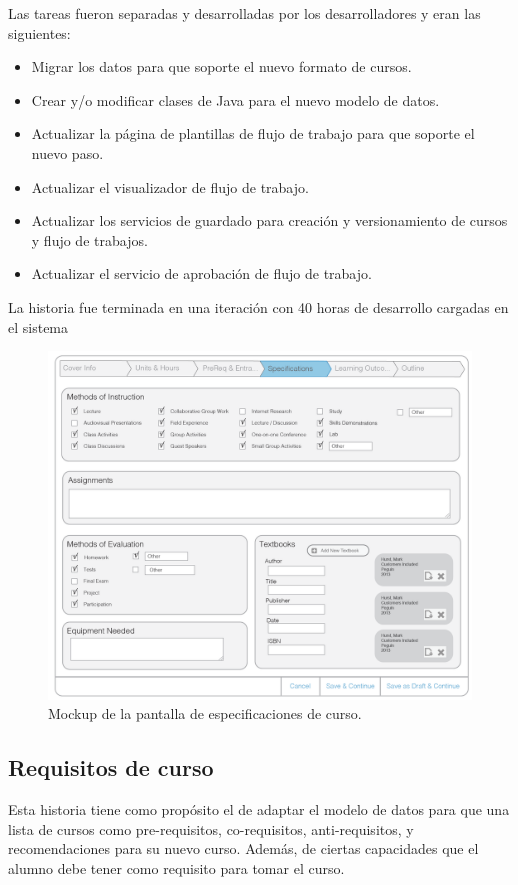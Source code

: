 Las tareas fueron separadas y desarrolladas por los desarrolladores y eran las siguientes:
\begin{itemize}
	\item Migrar los datos para que soporte el nuevo formato de cursos.
	\item Crear y/o modificar clases de Java para el nuevo modelo de datos.
	\item Actualizar la página de plantillas de flujo de trabajo para que soporte el nuevo paso.
	\item Actualizar el visualizador de flujo de trabajo.
	\item Actualizar los servicios de guardado para creación y versionamiento de cursos y flujo de trabajos.
	\item Actualizar el servicio de aprobación de flujo de trabajo.
\end{itemize}

La historia fue terminada en una iteración con 40 horas de desarrollo cargadas en el sistema

\begin{figure}[H]
\centering
\includegraphics[scale=0.3]{Capitulos/DesarrollodelaAplicacion/Imagenes/course_specs}
\caption{Mockup de la pantalla de especificaciones de curso.}
  \label{course_specs}
\end{figure}

\subsection{Requisitos de curso}
Esta historia tiene como propósito el de adaptar el modelo de datos para que una lista de cursos como pre-requisitos, co-requisitos, anti-requisitos, y recomendaciones para su nuevo curso. Además, de ciertas capacidades que el alumno debe tener como requisito para tomar el curso.

